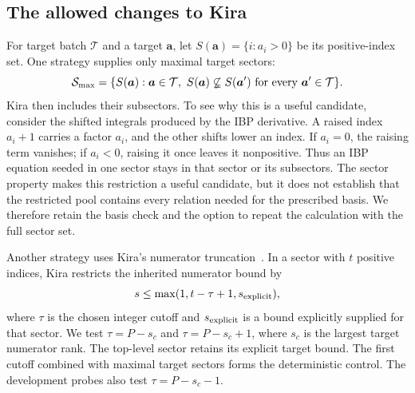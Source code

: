 \subsection{The allowed changes to Kira}
For target batch $\mathcal T$ and a target $\boldsymbol a$, let $S(\boldsymbol a)=\{i:a_i>0\}$ be its
positive-index set. One strategy supplies only maximal target sectors:
\begin{equation}
 \mathcal S_{\rm max}
 =\{S(\boldsymbol a):\boldsymbol a\in\mathcal T,
 \ S(\boldsymbol a)\not\subsetneq S(\boldsymbol a')
 \text{ for every }\boldsymbol a'\in\mathcal T\}.
 \label{eq:type-sectors}
\end{equation}
Kira then includes their subsectors. To see why this is a useful candidate,
consider the shifted integrals produced by the IBP derivative. A raised
index $a_i+1$ carries a factor $a_i$, and the other shifts lower an index.
If $a_i=0$, the raising term vanishes; if $a_i<0$, raising it once leaves
it nonpositive. Thus an IBP equation seeded in one sector stays in that
sector or its subsectors. The sector property makes this restriction a useful candidate, but it does not establish that the restricted pool contains every relation needed for the prescribed basis. We therefore retain the basis check and the option to repeat the calculation with the full sector set.

Another strategy uses Kira's numerator truncation~\cite{Kira3}. In a sector
with $t$ positive indices, Kira restricts the inherited numerator bound by
\begin{equation}
 s\leq\max(1,t-\tau+1,s_{\rm explicit}),
 \label{eq:type-truncation}
\end{equation}
where $\tau$ is the chosen integer cutoff and $s_{\rm explicit}$ is a
bound explicitly supplied for that sector. We test
$\tau=P-s_c$ and $\tau=P-s_c+1$, where $s_c$ is the largest target numerator
rank. The top-level sector retains its explicit target bound. The first
cutoff combined with maximal target sectors forms the deterministic
control. The development probes also test $\tau=P-s_c-1$.

